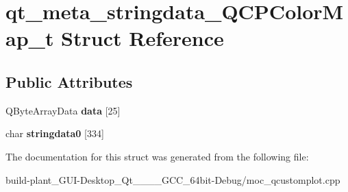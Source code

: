\hypertarget{structqt__meta__stringdata__QCPColorMap__t}{}\section{qt\+\_\+meta\+\_\+stringdata\+\_\+\+Q\+C\+P\+Color\+Map\+\_\+t Struct Reference}
\label{structqt__meta__stringdata__QCPColorMap__t}
\subsection*{Public Attributes}
\begin{DoxyCompactItemize}
\item 
\mbox{\label{structqt__meta__stringdata__QCPColorMap__t_accab0e8d36920ac71eecd79ccaa7badf}} 
Q\+Byte\+Array\+Data {\bfseries data} \mbox{[}25\mbox{]}
\item 
\mbox{\label{structqt__meta__stringdata__QCPColorMap__t_a2edec26054af0f1b2cc81406b21fca92}} 
char {\bfseries stringdata0} \mbox{[}334\mbox{]}
\end{DoxyCompactItemize}


The documentation for this struct was generated from the following file\+:\begin{DoxyCompactItemize}
\item 
build-\/plant\+\_\+\+G\+U\+I-\/\+Desktop\+\_\+\+Qt\+\_\+\_\+\_\+\_\+\+G\+C\+C\+\_\+64bit-\/\+Debug/moc\+\_\+qcustomplot.\+cpp\end{DoxyCompactItemize}
